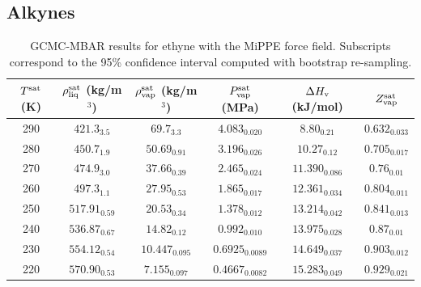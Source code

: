 \documentclass[journal=jctc,manuscript=article]{achemso}
\begin{document}
\newpage
\clearpage

\subsection{Alkynes}

\begin{table}[htb!]
	\caption{GCMC-MBAR results for ethyne with the MiPPE force field. Subscripts correspond to the 95\% confidence interval computed with bootstrap re-sampling.}
	\begin{center}
		\begin{tabular}{|c|c|c|c|c|c|}
			\hline
			$T^{\rm sat}$ (K) & $\rho_{\rm liq}^{\rm sat}$ (kg/m$^3$) & $\rho_{\rm vap}^{\rm sat}$ (kg/m$^3$) & $P_{\rm vap}^{\rm sat}$ (MPa) & $\Delta H_{\rm v}$ (kJ/mol) & $Z_{\rm vap}^{\rm sat}$ \\ \hline
			290 & $421.3_{3.5}$ & $69.7_{3.3}$ & $4.083_{0.020}$ & $8.80_{0.21}$ & $0.632_{0.033}$ \\
			280 & $450.7_{1.9}$ & $50.69_{0.91}$ & $3.196_{0.026}$ & $10.27_{0.12}$ & $0.705_{0.017}$ \\
			270 & $474.9_{3.0}$ & $37.66_{0.39}$ & $2.465_{0.024}$ & $11.390_{0.086}$ & $0.76_{0.01}$ \\
			260 & $497.3_{1.1}$ & $27.95_{0.53}$ & $1.865_{0.017}$ & $12.361_{0.034}$ & $0.804_{0.011}$ \\
			250 & $517.91_{0.59}$ & $20.53_{0.34}$ & $1.378_{0.012}$ & $13.214_{0.042}$ & $0.841_{0.013}$ \\
			240 & $536.87_{0.67}$ & $14.82_{0.12}$ & $0.992_{0.010}$ & $13.975_{0.028}$ & $0.87_{0.01}$ \\
			230 & $554.12_{0.54}$ & $10.447_{0.095}$ & $0.6925_{0.0089}$ & $14.649_{0.037}$ & $0.903_{0.012}$ \\
			220 & $570.90_{0.53}$ & $7.155_{0.097}$ & $0.4667_{0.0082}$ & $15.283_{0.049}$ & $0.929_{0.021}$ \\
			\hline
		\end{tabular}
	\end{center}
\end{table}
\end{document}
